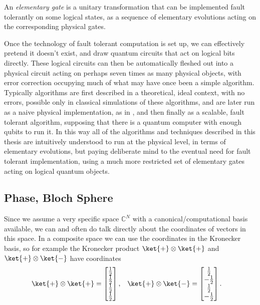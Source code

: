 An \emph{elementary gate} is a unitary transformation that can be implemented fault tolerantly on some logical states, as a sequence of elementary evolutions acting on the corresponding physical gates.

Once the technology of fault tolerant computation is set up, we can effectively pretend it doesn't exist, and draw quantum circuits that act on logical bits directly. These logical circuits can then be automatically fleshed out into a physical circuit acting on perhaps seven times as many physical objects, with error correction occupying much of what may have once been a simple algorithm. Typically algorithms are first described in a theoretical, ideal context, with no errors, possible only in classical simulations of these algorithms, and are later run as a naive physical implementation, as in \cite{algos}, and then finally as a scalable, fault tolerant algorithm, supposing that there is a quantum computer with enough qubits to run it. In this way all of the algorithms and techniques described in this thesis are intuitively understood to run at the physical level, in terms of elementary evolutions, but paying deliberate mind to the eventual need for fault tolerant implementation, using a much more restricted set of elementary gates acting on logical quantum objects.

\subsection{Phase, Bloch Sphere}
Since we assume a very specific space $\mathbb{C}^N$ with a canonical/computational basis available, we can and often do talk directly about the coordinates of vectors in this space. In a composite space we can use the coordinates in the Kronecker basis, so for example the Kronecker product $\ket{+}\otimes \ket{+}$ and $\ket{+} \otimes \ket{-}$ have coordinates
\begin{align*}
\ket{+} \otimes \ket{+} = \left[\begin{matrix}
\frac{1}{2} \\
\frac{1}{2} \\
\frac{1}{2} \\
\frac{1}{2} \\
\end{matrix}\right],
&&&
\ket{+} \otimes \ket{-} = \left[\begin{matrix}
	\frac{1}{2} \\
	-\frac{1}{2} \\
	\frac{1}{2} \\
	-\frac{1}{2} \\
\end{matrix}\right].\end{align*}

